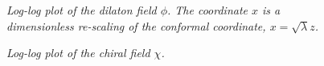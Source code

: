 \documentclass[12pt]{article}
\begin{document}
\begin{figure}[htb]
\caption{\textit{Log-log plot of the dilaton field $\phi$. The coordinate $x$ is a dimensionless re-scaling of the conformal coordinate, $x=\sqrt{\lambda}z$.}}
\label{figDilaton}
\end{figure}

\begin{figure}[htb]
\caption{\textit{Log-log plot of the chiral field $\chi$. }}
\label{figChiral}
\end{figure}
\end{document}
